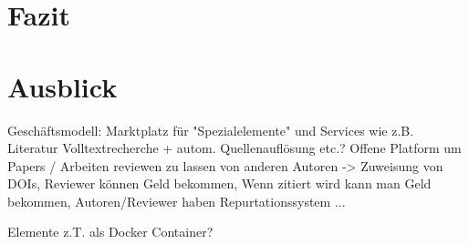 \chapter{Fazit}


\chapter{Ausblick}

Geschäftsmodell: Marktplatz für "Spezialelemente" und Services wie z.B. Literatur Volltextrecherche + autom. Quellenauflösung etc.? Offene Platform um Papers / Arbeiten reviewen zu lassen von anderen Autoren -> Zuweisung von DOIs, Reviewer können Geld bekommen, Wenn zitiert wird kann man Geld bekommen, Autoren/Reviewer haben Repurtationssystem ...

Elemente z.T. als Docker Container?


